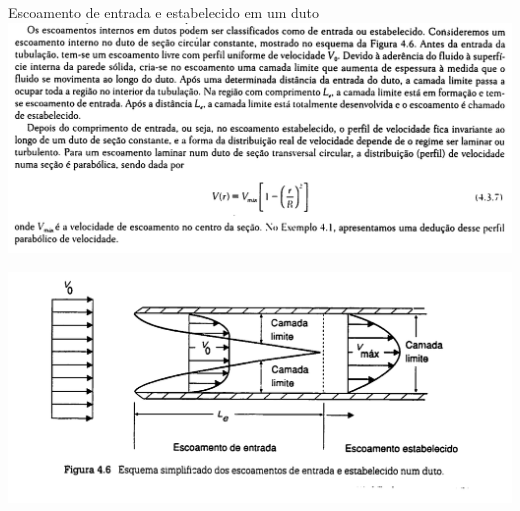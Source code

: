 \documentclass[t,%
brazilian,%
11pt,%
aspectratio=169,%
table%
]{beamer}
\begin{document}
\begin{frame}{Escoamento de entrada e estabelecido em um duto}
    \centering
    \includegraphics[width=\textwidth]{images/Captura de tela de 2025-04-15 16-23-56.png}
\end{frame}

\begin{frame}
    \centering
    \includegraphics[width=\textwidth]{images/Captura de tela de 2025-04-15 16-26-48.png}
\end{frame}
\end{document}
